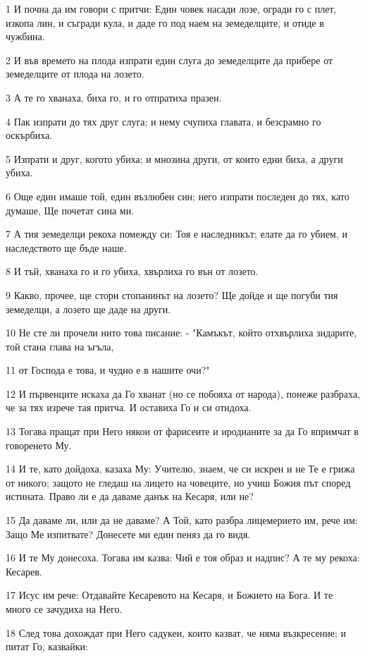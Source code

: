 \par 1 И почна да им говори с притчи: Един човек насади лозе, огради го с плет, изкопа лин, и съгради кула, и даде го под наем на земеделците, и отиде в чужбина.
\par 2 И във времето на плода изпрати един слуга до земеделците да прибере от земеделците от плода на лозето.
\par 3 А те го хванаха, биха го, и го отпратиха празен.
\par 4 Пак изпрати до тях друг слуга; и нему счупиха главата, и безсрамно го оскърбиха.
\par 5 Изпрати и друг, когото убиха; и мнозина други, от които едни биха, а други убиха.
\par 6 Още един имаше той, един възлюбен син; него изпрати последен до тях, като думаше, Ще почетат сина ми.
\par 7 А тия земеделци рекоха помежду си: Тоя е наследникът; елате да го убием, и наследството ще бъде наше.
\par 8 И тъй, хванаха го и го убиха, хвърлиха го вън от лозето.
\par 9 Какво, прочее, ще стори стопанинът на лозето? Ще дойде и ще погуби тия земеделци, а лозето ще даде на други.
\par 10 Не сте ли прочели нито това писание: - "Камъкът, който отхвърлиха зидарите, той стана глава на ъгъла,
\par 11 от Господа е това, и чудно е в нашите очи?"
\par 12 И първенците искаха да Го хванат (но се побояха от народа), понеже разбраха, че за тях изрече тая притча. И оставиха Го и си отидоха.
\par 13 Тогава пращат при Него някои от фарисеите и иродианите за да Го впримчат в говоренето Му.
\par 14 И те, като дойдоха, казаха Му: Учителю, знаем, че си искрен и не Те е грижа от никого; защото не гледаш на лицето на човеците, но учиш Божия път според истината. Право ли е да даваме данък на Кесаря, или не?
\par 15 Да даваме ли, или да не даваме? А Той, като разбра лицемерието им, рече им: Защо Ме изпитвате? Донесете ми един пеняз да го видя.
\par 16 И те Му донесоха. Тогава им казва: Чий е тоя образ и надпис? А те му рекоха: Кесарев.
\par 17 Исус им рече: Отдавайте Кесаревото на Кесаря, и Божието на Бога. И те много се зачудиха на Него.
\par 18 След това дохождат при Него садукеи, които казват, че няма възкресение; и питат Го, казвайки:
